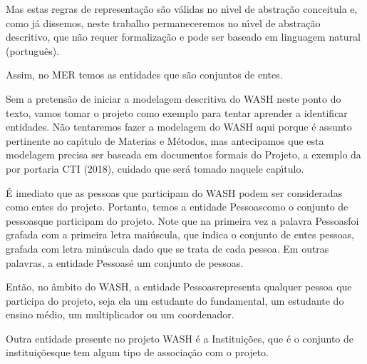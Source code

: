 \documentclass[
12pt,		%
openright,	%
twoside,  %
a4paper,			%
chapter=TITLE,		%
english,			%
french,				%
spanish,			%
brazil				%
]{USPSC-classe/USPSC_RedarTex}
\begin{document}
Mas estas regras de representa\c{c}\~ao s\~ao v\'alidas no n\'{\i}vel de abstra\c{c}\~ao conceitula e, como j\'a dissemos, neste trabalho permaneceremos no n\'{\i}vel de abstra\c{c}\~ao descritivo, que n\~ao requer formaliza\c{c}\~ao e pode ser baseado em linguagem natural (portugu\^es).








Assim, no MER temos as entidades que s\~ao conjuntos de entes.








Sem a pretens\~ao de iniciar a modelagem descritiva do WASH neste ponto do texto, vamos tomar o projeto como exemplo para tentar aprender a identificar entidades. N\~ao tentaremos fazer a modelagem do WASH aqui porque \'e assunto pertinente ao cap\'{\i}tulo de Materias e M\'etodos, mas antecipamos que esta modelagem precisa ser baseada em documentos formais do Projeto, a exemplo da por portaria CTI (2018), cuidado que ser\'a tomado naquele cap\'{\i}tulo.








\'E imediato que as pessoas que participam do WASH podem ser consideradas como entes do projeto. Portanto, temos a entidade \textquotedbl Pessoas\textquotedbl  como o conjunto de \textquotedbl pessoas\textquotedbl  que participam do projeto. Note que na primeira vez a palavra \textquotedbl Pessoas\textquotedbl  foi grafada com a primeira letra mai\'uscula, que indica o conjunto de entes \textquotedbl pessoas\textquotedbl , grafada com letra min\'uscula dado que se trata de cada pessoa. Em outras palavras, a entidade \textquotedbl Pessoas\textquotedbl  \'e um conjunto de \textquotedbl pessoas\textquotedbl .








Ent\~ao, no \^ambito do WASH, a entidade \textquotedbl Pessoas\textquotedbl  representa qualquer pessoa que participa do projeto, seja ela um estudante do fundamental, um estudante do ensino m\'edio, um multiplicador ou um coordenador.








Outra entidade presente no projeto WASH \'e a \textquotedbl Institui\c{c}\~oes\textquotedbl , que \'e o conjunto de \textquotedbl institui\c{c}\~oes\textquotedbl  que tem algum tipo de associa\c{c}\~ao com o projeto.
\end{document}
